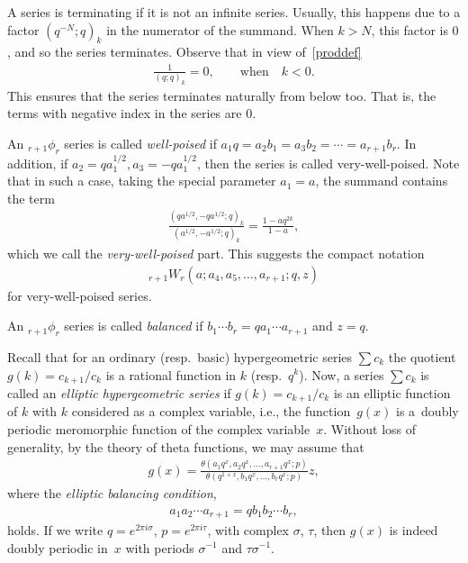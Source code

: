 \documentclass[pdftex]{sigma}
\numberwithin{equation}{section}
\newcommand{\qrfac}[2]{{\left({#1}; q\right)_{#2}}} %
\newcommand{\elliptictheta}[1]{\theta \left({#1} ; p\right) }
\begin{document}
A series is terminating if it is not an infinite series. Usually, this happens due to a factor $\qrfac{q^{-N}}{k}$ in the numerator of the summand. When $k>N$, this factor is $0$, and so the series terminates. Observe that in view of~\eqref{proddef}
\begin{gather}\label{term-from-below}
\frac{1}{\qrfac{q}{k}} = 0, \qquad \text{when} \quad k<0.
\end{gather} This ensures that the series terminates naturally from below too. That is, the terms with negative index in the series are $0$.

An $_{r+1}\phi_r$ series is called {\em well-poised} if $a_1q=a_2b_1=a_3b_2 = \cdots = a_{r+1}b_r$. In addition, if $a_2=qa_1^{1/2}, a_3=-qa_1^{1/2}$, then the series is called very-well-poised. Note that in such a case, taking the special parameter $a_1=a$, the summand contains the term
\begin{gather*}
\frac{\qrfac{qa^{1/2}, -qa^{1/2} }{k}}{\qrfac{a^{1/2}, -a^{1/2}}{k}} = \frac{1-aq^{2k}}{1-a},
\end{gather*}
which we call the {\em very-well-poised} part. This suggests the compact notation
\begin{gather*}_{r+1}W_r(a; a_4, a_5, \dots, a_{r+1}; q, z)
\end{gather*} for very-well-poised series.

An $_{r+1}\phi_r$ series is called {\em balanced} if $b_1\cdots b_r=qa_1\cdots a_{r+1}$ and $z=q$.

Recall that for an ordinary (resp.\ basic) hypergeometric series $\sum c_k$ the quotient $g(k) = c_{k+1}/c_k$ is a rational function in $k$ (resp.~$q^k$). Now, a series $\sum c_k$ is called an {\it elliptic hypergeometric series} if $g(k) = c_{k+1}/c_k$ is an elliptic function of $k$ with $k$ considered as a complex variable, i.e., the function~$g(x)$ is a~doubly periodic meromorphic function of the complex variable~$x$. Without loss of generality, by the theory of theta functions, we may assume that
\begin{gather*}
g(x)=\frac{\elliptictheta{ a_1q^x,a_2q^x,\dots,a_{r+1}q^x}} {\elliptictheta{q^{1+x},b_1q^x,\dots,b_rq^x}} z,
\end{gather*}
where the {\em elliptic balancing condition},
\begin{gather*}
a_1a_2\cdots a_{r+1}=qb_1b_2\cdots b_r,
\end{gather*}
holds. If we write $q=e^{2\pi i\sigma}$, $p=e^{2\pi i\tau}$, with complex $\sigma$, $\tau$, then $g(x)$ is indeed doubly periodic in~$x$ with periods $\sigma^{-1}$ and $\tau\sigma^{-1}$.
\end{document}
